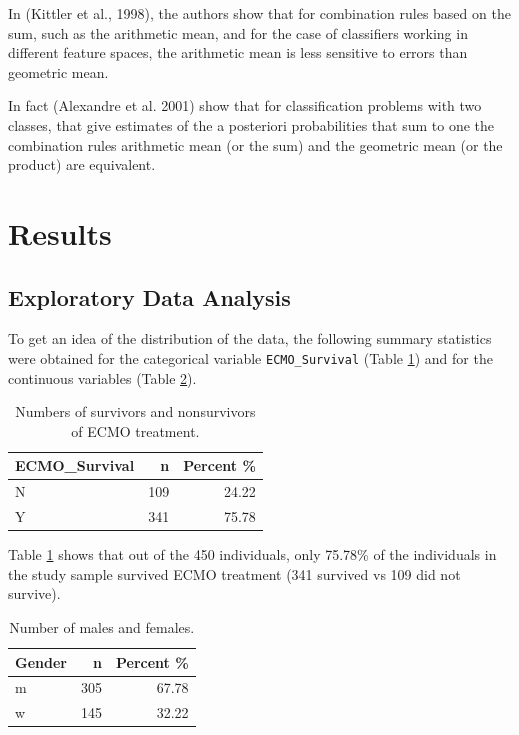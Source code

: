 \documentclass[12pt,]{article}
\begin{document}
In (Kittler et al., 1998), the authors show that for combination rules
based on the sum, such as the arithmetic mean, and for the case of
classifiers working in different feature spaces, the arithmetic mean is
less sensitive to errors than geometric mean.

In fact (Alexandre et al. 2001) show that for classification problems
with two classes, that give estimates of the a posteriori probabilities
that sum to one the combination rules arithmetic mean (or the sum) and
the geometric mean (or the product) are equivalent.

\newpage

\section{Results}\label{results}

\subsection{Exploratory Data Analysis}\label{exploratory-data-analysis}

To get an idea of the distribution of the data, the following summary
statistics were obtained for the categorical variable
\texttt{ECMO\_Survival} (Table \ref{tab:ECMO_Survival-table}) and for
the continuous variables (Table \ref{tab:Gender-table}).

\begin{table}[!h]

\caption{\label{tab:unnamed-chunk-1}\label{tab:ECMO_Survival-table} Numbers of survivors and nonsurvivors of ECMO treatment.}
\centering
\fontsize{10}{12}\selectfont
\begin{tabular}{lrr}
\toprule
ECMO\_Survival & n & Percent \%\\
\midrule
N & 109 & 24.22\\
Y & 341 & 75.78\\
\bottomrule
\end{tabular}
\end{table}

Table \ref{tab:ECMO_Survival-table} shows that out of the 450
individuals, only 75.78\% of the individuals in the study sample
survived ECMO treatment (341 survived vs 109 did not survive).

\begin{table}[!h]

\caption{\label{tab:unnamed-chunk-2}\label{tab:Gender-table} Number of males and females.}
\centering
\fontsize{10}{12}\selectfont
\begin{tabular}{lrr}
\toprule
Gender & n & Percent \%\\
\midrule
m & 305 & 67.78\\
w & 145 & 32.22\\
\bottomrule
\end{tabular}
\end{table}
\end{document}
